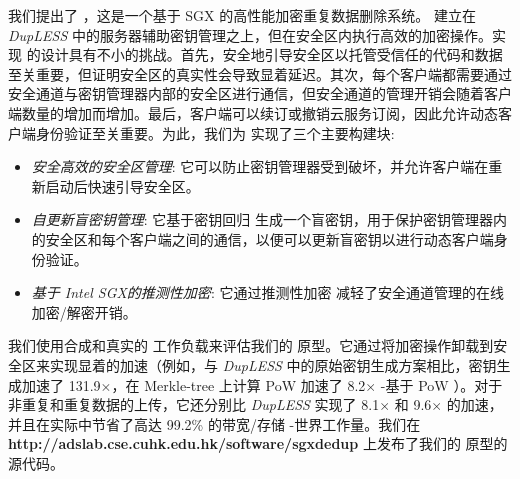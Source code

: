 我们提出了 \sysnameS，这是一个基于 SGX 的高性能加密重复数据删除系统。 \sysnameS 建立在 {\em DupLESS} \cite{bellare13b} 中的服务器辅助密钥管理之上，但在安全区内执行高效的加密操作。实现 \sysnameS 的设计具有不小的挑战。首先，安全地引导安全区以托管受信任的代码和数据至关重要，但证明安全区的真实性会导致显着延迟。其次，每个客户端都需要通过安全通道与密钥管理器内部的安全区进行通信，但安全通道的管理开销会随着客户端数量的增加而增加。最后，客户端可以续订或撤销云服务订阅，因此允许动态客户端身份验证至关重要。为此，我们为 \sysnameS 实现了三个主要构建块: 

\begin{itemize}[leftmargin=*]
    \item \textit{安全高效的安全区管理}:
        它可以防止密钥管理器受到破坏，并允许客户端在重新启动后快速引导安全区。
    \item \textit{自更新盲密钥管理}:
        它基于密钥回归 \cite{fu06} 生成一个盲密钥，用于保护密钥管理器内的安全区和每个客户端之间的通信，以便可以更新盲密钥以进行动态客户端身份验证。
    \item \textit{基于 Intel SGX的推测性加密}:
        它通过推测性加密 \cite{eduardo19} 减轻了安全通道管理的在线加密/解密开销。
\end{itemize}

我们使用合成和真实的 \cite{fsl,meyer11} 工作负载来评估我们的 \sysnameS 原型。它通过将加密操作卸载到安全区来实现显着的加速（例如，与 {\em DupLESS} \cite{bellare13b} 中的原始密钥生成方案相比，密钥生成加速了 131.9$\times$，在 Merkle-tree 上计算 PoW 加速了 8.2$\times$ -基于 PoW \cite{halevi11}）。对于非重复和重复数据的上传，它还分别比 {\em DupLESS} \cite{bellare13b} 实现了 8.1$\times$ 和 9.6$\times$ 的加速，并且在实际中节省了高达 99.2\% 的带宽/存储 -世界工作量。我们在 {\bf http://adslab.cse.cuhk.edu.hk/software/sgxdedup} 上发布了我们的 \sysnameS 原型的源代码。 

